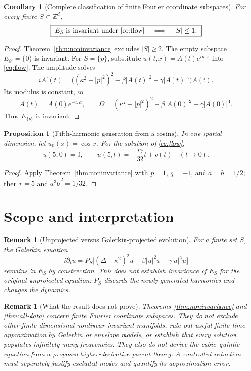\documentclass[11pt]{amsart}
\newtheorem{proposition}[theorem]{Proposition}
\newtheorem{corollary}[theorem]{Corollary}
\newtheorem{remark}[theorem]{Remark}
\newcommand{\Z}{\mathbb Z}
\begin{document}
\begin{corollary}[Complete classification of finite Fourier coordinate subspaces]
\label{cor:classification}
For every finite $S\subset\Z^d$,
\[
 \boxed{\ E_S\text{ is invariant under \eqref{eq:flow}}
 \quad\Longleftrightarrow\quad |S|\le1.\ }
\]
\end{corollary}

\begin{proof}
Theorem~\ref{thm:noninvariance} excludes $|S|\ge2$.
The empty subspace $E_\varnothing=\{0\}$ is invariant.
For $S=\{p\}$, substitute $u(t,x)=A(t)e^{ip\cdot x}$ into
\eqref{eq:flow}.  The amplitude solves
\[
 iA'(t)=\big((\kappa^2-|p|^2)^2-\beta|A(t)|^2
                    +\gamma|A(t)|^4\big)A(t).
\]
Its modulus is constant, so
\[
 A(t)=A(0)e^{-i\Omega t},\qquad
 \Omega=(\kappa^2-|p|^2)^2-\beta|A(0)|^2+\gamma|A(0)|^4.
\]
Thus $E_{\{p\}}$ is invariant.
\end{proof}

\begin{proposition}[Fifth-harmonic generation from a cosine]
\label{prop:cos}
In one spatial dimension, let $u_0(x)=\cos x$.  For the solution
of \eqref{eq:flow},
\[
 \widehat u(5,0)=0,
 \qquad
 \widehat u(5,t)=-\frac{i\gamma}{32}t+o(t)
 \quad(t\to0).
\]
\end{proposition}

\begin{proof}
Apply Theorem~\ref{thm:noninvariance} with
$p=1$, $q=-1$, and $a=b=1/2$; then $r=5$ and
$a^3\overline b^{\,2}=1/32$.
\end{proof}

\section{Scope and interpretation}

\begin{remark}[Unprojected versus Galerkin-projected evolution]
For a finite set $S$, the Galerkin equation
\[
 i\partial_tu=P_S\big[(\Delta+\kappa^2)^2u
  -\beta|u|^2u+\gamma|u|^4u\big]
\]
remains in $E_S$ by construction.  This does not establish invariance
of $E_S$ for the original unprojected equation: $P_S$ discards the
newly generated harmonics and changes the dynamics.
\end{remark}

\begin{remark}[What the result does not prove]
Theorems~\ref{thm:noninvariance} and \ref{thm:all-data}
concern finite \emph{Fourier coordinate subspaces}.  They do not exclude
other finite-dimensional nonlinear invariant manifolds, rule out useful
finite-time approximation by Galerkin or envelope models, or establish
that every solution populates infinitely many frequencies.  They also
do not derive the cubic--quintic equation from a proposed higher-derivative
parent theory.  A controlled reduction must separately justify excluded
modes and quantify its approximation error.
\end{remark}
\end{document}
